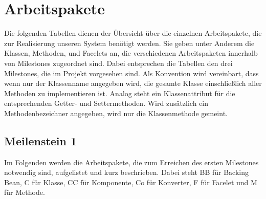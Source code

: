 \documentclass{article}
\begin{document}
\section{Arbeitspakete}

Die folgenden Tabellen dienen der Übersicht über die einzelnen Arbeitspakete, die zur Realisierung unseren System benötigt werden.
Sie geben unter Anderem die Klassen, Methoden, und Facelets an, die verschiedenen Arbeitspaketen innerhalb von Milestones zugeordnet sind. 
Dabei entsprechen die Tabellen den drei Milestones, die im Projekt vorgesehen sind.
Als Konvention wird vereinbart, dass wenn nur der Klassenname angegeben wird, die gesamte Klasse einschließlich aller Methoden zu implementieren ist. 
Analog steht ein Klassenattribut für die entsprechenden Getter- und Settermethoden.
Wird zusätzlich ein Methodenbezeichner angegeben, wird nur die Klassenmethode gemeint.


\subsection{Meilenstein 1}
Im Folgenden werden die Arbeitspakete, die zum Erreichen des ersten Milestones notwendig sind, aufgelistet und kurz beschrieben. Dabei steht BB für Backing Bean, C für Klasse, CC für Komponente, Co für Konverter, F für Facelet und M für Methode.



\end{document}
